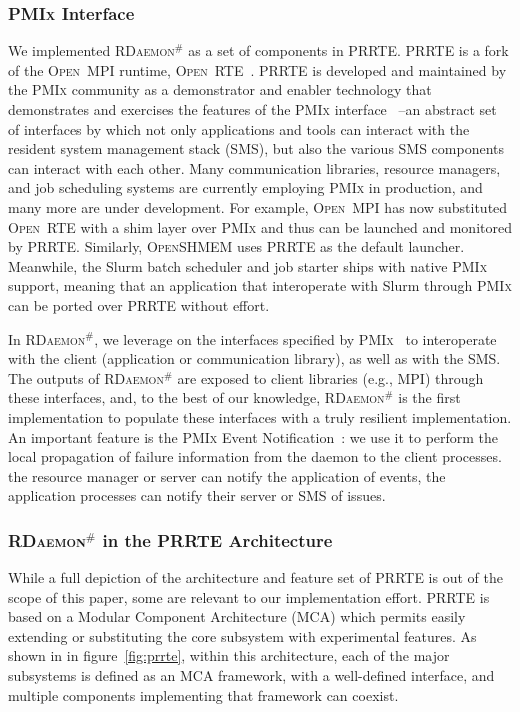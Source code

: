 \documentclass[sigconf]{acmart}
\newcommand{\prrte}[0]{\textsc{PRRTE}\xspace}
\newcommand{\pmix}[0]{\textsc{PMIx}\xspace}
\newcommand{\orte}[0]{\textsc{Open~RTE}\xspace}
\newcommand{\ompi}[0]{\textsc{Open~MPI}\xspace}
\newcommand{\oshmem}[0]{\textsc{OpenSHMEM}\xspace}
\newcommand{\ourwork}[0]{\textsc{RDaemon}\ensuremath{^\#}\xspace}
\begin{document}
\subsubsection{\pmix Interface}
We implemented \ourwork as a set of components in \prrte. \prrte is a fork of the \ompi runtime, \orte~\cite{Castain05}. \prrte is developed and maintained
by the \pmix community as a demonstrator and enabler technology that demonstrates
and exercises the features of the \pmix interface~\cite{CASTAIN18} --an abstract set of interfaces by which not only applications and tools can interact with the resident system management stack (SMS), but also the various SMS components can interact with each other.
Many communication libraries, resource managers, and job scheduling systems are currently employing \pmix in production, and many more are under development.
For example, \ompi has now substituted \orte with a shim layer over \pmix and thus can be launched and monitored by \prrte.
Similarly, \oshmem uses \prrte as the default launcher.
Meanwhile, the Slurm batch scheduler and job starter ships with native \pmix support, meaning that an application that interoperate with Slurm through \pmix can be ported  over \prrte without effort.

In \ourwork, we leverage on the interfaces specified by \pmix~\cite{Ralph15} to interoperate 
with the client (application or communication library), as well as with the 
SMS. 
The outputs of \ourwork are exposed to client libraries (e.g., MPI) through
these interfaces, and, to the best of our knowledge, \ourwork is the first
implementation to populate these interfaces with a truly resilient implementation.
An important feature is the \pmix Event Notification~\cite{Ralph002}: 
we use it to perform the local propagation of failure information from the 
daemon to the client processes. the resource manager or server can notify the application of events, the application processes can notify their server or SMS of issues.

\subsubsection{\ourwork in the \prrte Architecture}

While a full depiction of the architecture and feature set of \prrte is out of the scope of this paper, some are relevant to our implementation effort.
\prrte is based on a Modular Component Architecture (MCA) which permits easily extending or substituting the core subsystem with experimental features.
As shown in in figure~\ref{fig:prrte}, within this architecture, each of the major subsystems is defined as an MCA framework, with a well-defined interface, and multiple components implementing that framework can coexist.
\end{document}
